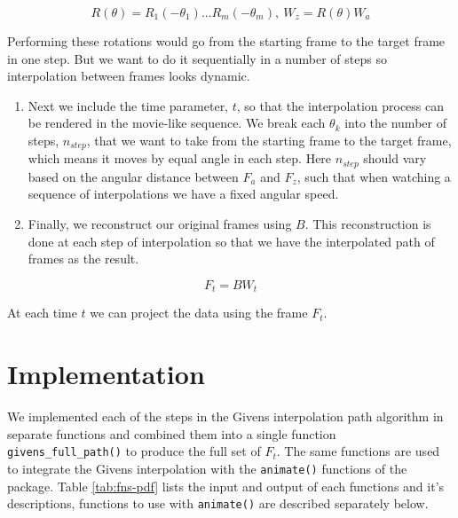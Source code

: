 \[R(\theta) = R_1(-\theta_1) ... R_m(-\theta_m), \    W_z = R(\theta)W_a\]

Performing these rotations would go from the starting frame to the
target frame in one step. But we want to do it sequentially in a number
of steps so interpolation between frames looks dynamic.

\begin{enumerate}
\def\labelenumi{\arabic{enumi}.}
\setcounter{enumi}{4}
\item
  Next we include the time parameter, \(t\), so that the interpolation
  process can be rendered in the movie-like sequence. We break each
  \(\theta_k\) into the number of steps, \(n_{step}\), that we want to
  take from the starting frame to the target frame, which means it moves
  by equal angle in each step. Here \(n_{step}\) should vary based on
  the angular distance between \(F_a\) and \(F_z\), such that when
  watching a sequence of interpolations we have a fixed angular speed.
\item
  Finally, we reconstruct our original frames using \(B\). This
  reconstruction is done at each step of interpolation so that we have
  the interpolated path of frames as the result.
\end{enumerate}

\[F_t = B  W_t\]

At each time \(t\) we can project the data using the frame \(F_t\).

\hypertarget{implementation}{%
\section{Implementation}\label{implementation}}

We implemented each of the steps in the Givens interpolation path
algorithm in separate functions and combined them into a single function
\texttt{givens\_full\_path()} to produce the full set of \(F_t\). The
same functions are used to integrate the Givens interpolation with the
\texttt{animate()} functions of the  package. Table
\ref{tab:fns-pdf} lists the input and output of each functions and it's
descriptions, functions to use with \texttt{animate()} are described
separately below.

